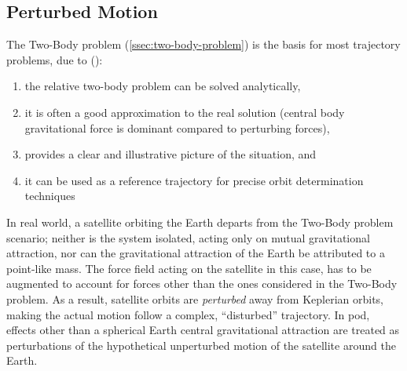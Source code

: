\subsection{Perturbed Motion}
\label{ssec:perturbed-motion}

The Two-Body problem (\autoref{ssec:two-body-problem}) is the basis for most 
trajectory problems, due to (\cite{Hintz2016}):
\begin{enumerate}
  \item the relative two-body problem can be solved analytically,
  \item it is often a good approximation to the real solution (central body 
    gravitational force is dominant compared to perturbing forces),
  \item provides a clear and illustrative picture of the situation, and
  \item it can be used as a reference trajectory for precise orbit 
    determination techniques
\end{enumerate}

In real world, a satellite orbiting the Earth departs from the Two-Body problem 
scenario; neither is the system isolated, acting only on mutual gravitational attraction, 
nor can the gravitational attraction of the Earth be attributed to a point-like mass. 
The force field acting on the satellite in this case, has to be augmented to account for 
forces other than the ones considered in the Two-Body problem. As a result, satellite 
orbits are \emph{perturbed} away from Keplerian orbits, making the actual motion 
follow a complex, ``disturbed'' trajectory. In \gls{pod}, effects other than a
spherical Earth central gravitational attraction are treated as perturbations of 
the hypothetical unperturbed motion of the satellite around the Earth. 

